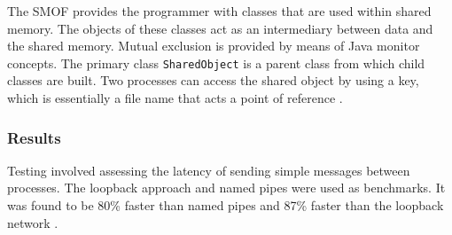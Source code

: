 \documentclass[12pt,a4paper,oneside]{article}
\def\code#1{\texttt{#1}}
\begin{document}
\begin{spacing}{1.4}
The SMOF provides the programmer with classes that are used within shared memory. The objects of these classes act as an intermediary between data and the shared memory. Mutual exclusion is provided by means of Java monitor concepts. The primary class \code{SharedObject} is a parent class from which child classes are built. Two processes can access the shared object by using a key, which is essentially a file name that acts a point of reference \citep{WellsEfficientIPCJava}.

\subsubsection{Results}
Testing involved assessing the latency of sending simple messages between processes. The loopback approach and named pipes were used as benchmarks. It was found to be 80\% faster than named pipes and 87\% faster than the loopback network \citep{WellsEfficientIPCJava}.
\end{spacing}
\end{document}
